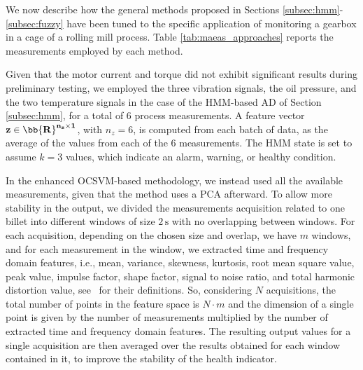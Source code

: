We now describe how the general methods proposed in Sections \ref{subsec:hmm}-\ref{subsec:fuzzy} have been tuned to the specific application of monitoring a gearbox in a cage of a rolling mill process. Table \ref{tab:maeas_approaches} reports the measurements employed by each method.

 
Given that the motor current and torque did not exhibit significant results during preliminary testing, we employed the three vibration signals, the oil pressure, and the two temperature signals in the case of the HMM-based AD of Section \ref{subsec:hmm}, for a total of 6 process measurements. A feature vector $\bf{z}\in \bb{R}^{n_z\times 1}$, with $n_z=6$, is computed from each batch of data, as the average of the values from each of the 6 measurements.
The HMM state is set to assume $k=3$ values, which indicate an alarm, warning, or healthy condition.

In the enhanced OCSVM-based methodology, we instead used all the available measurements, given that the method uses a PCA afterward. To allow more stability in the output, we divided the measurements acquisition related to one billet into different windows of size $2\, \text{s}$ with no overlapping between windows.
{For each acquisition, depending on the chosen size and overlap, we have $m$ windows, and for each measurement in the window, we extracted time and frequency domain features, i.e., mean, variance, skewness, kurtosis, {root mean square value, peak value, impulse factor, shape factor, signal to noise ratio, and total harmonic distortion value, see~\citep{sarda2021} for their definitions.} So, considering $N$ acquisitions, the total number of points in the feature space is $N\cdot m$ and the dimension of a single point is given by the number of measurements multiplied by the number of extracted time and frequency domain features.} 
{The resulting output values for a single acquisition are then averaged over the results obtained for each window contained in it, to improve the stability of the health indicator.} 

